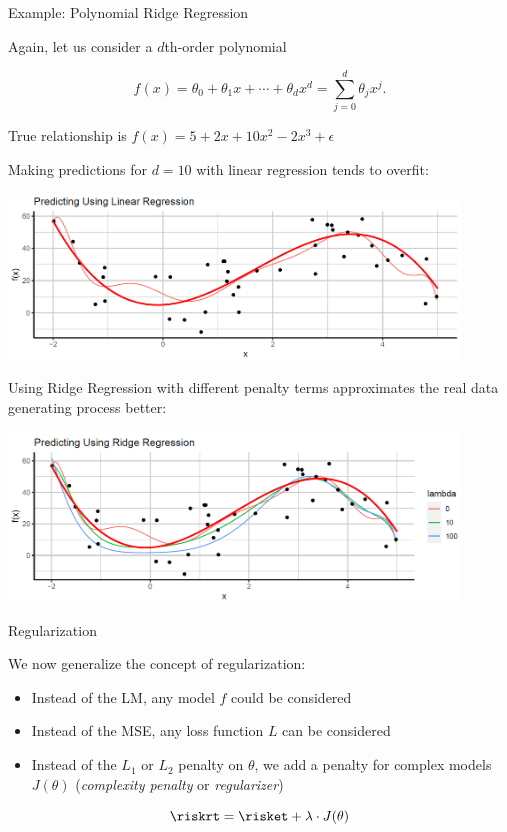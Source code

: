\begin{vbframe}{Example: Polynomial Ridge Regression}

Again, let us consider a \(d\)th-order polynomial

\[ f(x) = \theta_0 + \theta_1 x + \cdots + \theta_d x^d = \sum_{j = 0}^{d} \theta_j x^j\text{.} \]

True relationship is \(f(x) = 5 + 2x +10x^2 - 2x^3 + \epsilon\)

Making predictions for \(d = 10\) with linear regression tends to
overfit:

\begin{center}
\includegraphics[width=0.9\textwidth]{plots/poly-reg-example01.png}
\end{center}

\framebreak

Using Ridge Regression with different penalty terms approximates the
real data generating process better:

\vfill

\begin{center}
\includegraphics[width=0.9\textwidth]{plots/poly-reg-example02.png}
\end{center}

\end{vbframe}

\begin{frame}{Regularization}

We now generalize the concept of regularization:

\begin{itemize}

\item
  Instead of the LM, any model \(f\) could be considered
\item
  Instead of the MSE, any loss function \(L\) can be considered
\item
  Instead of the \(L_1\) or \(L_2\) penalty on \(\theta\), we add a
  penalty for complex models \(J(\theta)\) (\emph{complexity penalty} or
  \emph{regularizer})
\end{itemize}

\[
\riskrt = \risket + \lambda \cdot J(\theta)
\]

\end{frame}

